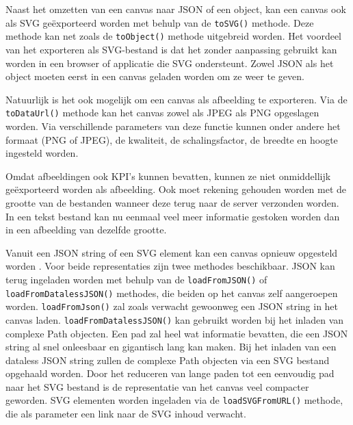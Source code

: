Naast het omzetten van een canvas naar JSON of een object, kan een canvas ook als SVG ge\"{e}xporteerd worden met behulp van de \texttt{toSVG()} methode. Deze methode kan net zoals de \texttt{toObject()} methode uitgebreid worden. Het voordeel van het exporteren als SVG-bestand is dat het zonder aanpassing gebruikt kan worden in een browser of applicatie die SVG ondersteunt. Zowel JSON als het object moeten eerst in een canvas geladen worden om ze weer te geven. 

Natuurlijk is het ook mogelijk om een canvas als afbeelding te exporteren. Via de \texttt{toDataUrl()} methode kan het canvas zowel als JPEG als PNG opgeslagen worden. Via verschillende parameters van deze functie kunnen onder andere het formaat (PNG of JPEG), de kwaliteit, de schalingsfactor, de breedte en hoogte ingesteld worden.

Omdat afbeeldingen ook KPI's kunnen bevatten, kunnen ze niet onmiddellijk ge\"{e}xporteerd worden als afbeelding. Ook moet rekening gehouden worden met de grootte van de bestanden wanneer deze terug naar de server verzonden worden. In een tekst bestand kan nu eenmaal veel meer informatie gestoken worden dan in een afbeelding van dezelfde grootte. 

Vanuit een JSON string of een SVG element kan een canvas opnieuw opgesteld worden \cite{SVGElement}. Voor beide representaties zijn twee methodes beschikbaar. JSON kan terug ingeladen worden met behulp van de \texttt{loadFromJSON()} of \texttt{loadFromDatalessJSON()} methodes, die beiden op het canvas zelf aangeroepen worden. \texttt{loadFromJson()} zal zoals verwacht gewoonweg een JSON string in het canvas laden. \texttt{loadFromDatalessJSON()} kan gebruikt worden bij het inladen van complexe Path objecten. Een pad zal heel wat informatie bevatten, die een JSON string al snel onleesbaar en gigantisch lang kan maken. Bij het inladen van een dataless JSON string zullen de complexe Path objecten via een SVG bestand opgehaald worden. Door het reduceren van lange paden tot een eenvoudig pad naar het SVG bestand is de representatie van het canvas veel compacter geworden. SVG elementen worden ingeladen via de \texttt{loadSVGFromURL()} methode, die als parameter een link naar de SVG inhoud verwacht. 


